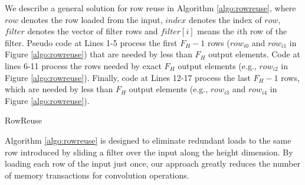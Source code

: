 We describe a general solution for row reuse in Algorithm \ref{algo:rowreuse}, where $row$ denotes the row loaded from the input, $index$ denotes the index of $row$, $filter$ denotes the vector of filter rows and $filter[i]$ means the $i$th row of the filter. 
Pseudo code at Lines 1-5 process the first $F_H-1$ rows ($row_{i0}$ and $row_{i1}$ in Figure \ref{algo:rowreuse}) that are needed by less than $F_H$ output elements. 
Code at lines 6-11 process the rows needed by exact $F_H$ output elements (e.g., $row_{i2}$ in Figure \ref{algo:rowreuse}). 
Finally, code at Lines 12-17 process the last $F_H-1$ rows, which are needed by less than $F_H$ output elements (e.g., $row_{i3}$ and $row_{i4}$ in Figure \ref{algo:rowreuse}).

\begin{algorithm}[t!]
\small
	\caption{RowReuse}
	\label{algo:rowreuse}
\end{algorithm}

Algorithm \ref{algo:rowreuse} is designed to eliminate redundant loads to the same row introduced by sliding a filter over the input along the height dimension. 
By loading each row of the input just once, our approach greatly reduces the number of memory transactions for convolution operations.
